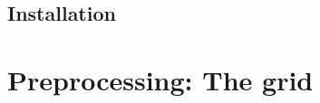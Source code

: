 \documentclass{report}
\newcommand{\todo}[1]{This section still has to be written by #1}
\begin{document}
	\section{Installation}
	






\chapter{Preprocessing: The grid}




\end{document}

